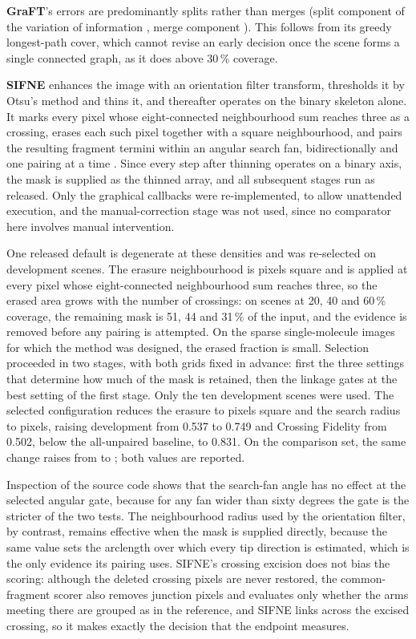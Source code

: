 \textbf{GraFT}'s errors are predominantly splits rather than merges (split
component of the variation of information \PlectaGraFTVISplit{}, merge
component \PlectaGraFTVIMerge{}). This follows from its greedy longest-path
cover, which cannot revise an early decision once the scene forms a single
connected graph, as it does above 30\,\% coverage.

\textbf{SIFNE} enhances the image with an orientation filter transform,
thresholds it by Otsu's method and thins it, and thereafter operates on the
binary skeleton alone. It marks every pixel whose eight-connected neighbourhood
sum reaches three as a crossing, erases each such pixel together with a square
neighbourhood, and pairs the resulting fragment termini within an angular
search fan, bidirectionally and one pairing at a time \citep{zhang2017sifne}.
Since every step after thinning operates on a binary axis, the mask is
supplied as the thinned array, and all subsequent stages run as released. Only
the graphical callbacks were re-implemented, to allow unattended execution,
and the manual-correction stage was not used, since no comparator here
involves manual intervention.

One released default is degenerate at these densities and was re-selected on
development scenes. The erasure neighbourhood is
\PlectaSifneShippedJuncSize{} pixels square and is applied at every pixel whose
eight-connected neighbourhood sum reaches three, so the erased area grows with
the number of crossings: on scenes at 20, 40 and 60\,\% coverage, the
remaining mask is 51, 44 and 31\,\% of the input, and the evidence is removed
before any pairing is attempted. On the sparse single-molecule images for
which the method was designed, the erased fraction is small. Selection
proceeded in two stages, with both grids fixed in advance: first the three
settings that determine how much of the mask is retained, then the linkage
gates at the best setting of the first stage. Only the ten development scenes
were used. The selected configuration reduces the erasure to
\PlectaSifneJuncSize{} pixels square and the search radius to
\PlectaSifneFanR{} pixels, raising development \Fone{} from 0.537 to 0.749 and
Crossing Fidelity from 0.502, below the all-unpaired baseline, to 0.831. On the
comparison set, the same change raises \Fone{} from \PlectaSifneShippedFOne{}
to \PlectaSifneFOne{}; both values are reported.

Inspection of the source code shows that the search-fan angle has no effect at
the selected angular gate, because for any fan wider than sixty degrees the
gate is the stricter of the two tests. The neighbourhood radius used by the
orientation filter, by contrast, remains effective when the mask is supplied
directly, because the same value sets the arclength over which every tip
direction is estimated, which is the only evidence its pairing uses. SIFNE's
crossing excision does not bias the scoring: although the deleted crossing
pixels are never restored, the common-fragment scorer also removes junction
pixels and evaluates only whether the arms meeting there are grouped as in the
reference, and SIFNE links across the excised crossing, so it makes exactly the
decision that the endpoint measures.

